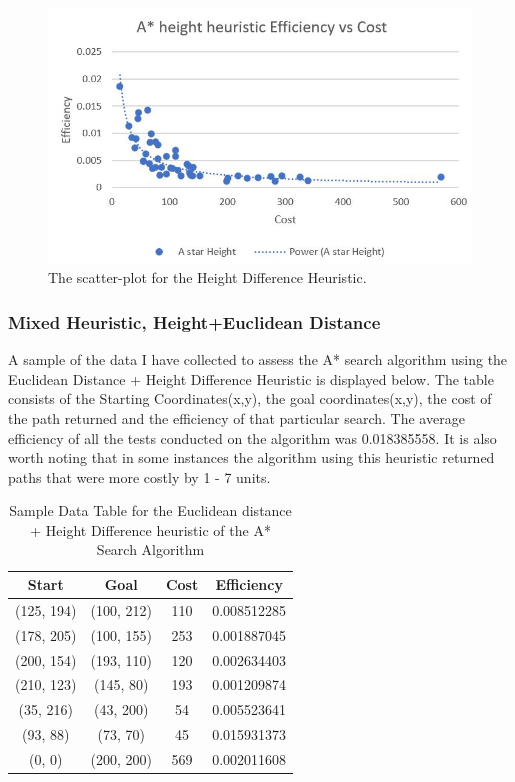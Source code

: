 \documentclass[11pt,oneside]{article}
\begin{document}
\begin{figure}[H]
    \centering
      \includegraphics[scale=0.8]{HD efficiency vs cost.JPG}
      \caption{The scatter-plot for the Height Difference Heuristic.}
      \label{fig:HDEvC}
    \end{figure} 

\subsubsection{Mixed Heuristic, Height+Euclidean Distance}
A sample of the data I have collected to assess the A* search algorithm using the Euclidean Distance + Height Difference Heuristic is displayed below. The table consists of the Starting Coordinates(x,y), the goal coordinates(x,y), the cost of the path returned and the efficiency of that particular search. The average efficiency of all the tests conducted on the algorithm was 0.018385558. It is also worth noting that in some instances the algorithm using this heuristic returned paths that were more costly by 1 - 7 units.

\begin{table}[H]
    \centering
    \begin{tabular}{|c|c|c|c|}
        Start        & Goal       & Cost & Efficiency \\ \hline
        (125, 194)   & (100, 212) & 110 & 0.008512285 \\
        (178, 205)   & (100, 155) & 253 & 0.001887045 \\
        (200, 154)   & (193, 110) & 120 & 0.002634403 \\
        (210, 123)   & (145, 80)  & 193 & 0.001209874 \\
        (35, 216)    & (43, 200)  & 54 & 0.005523641 \\
        (93, 88)     & (73, 70)   & 45 & 0.015931373 \\
        (0, 0)       & (200, 200) & 569 & 0.002011608 \\
    \end{tabular}
    \caption{Sample Data Table for the Euclidean distance + Height Difference heuristic of the A* Search Algorithm}
    \label{tab:my_label}
\end{table}
\end{document}
